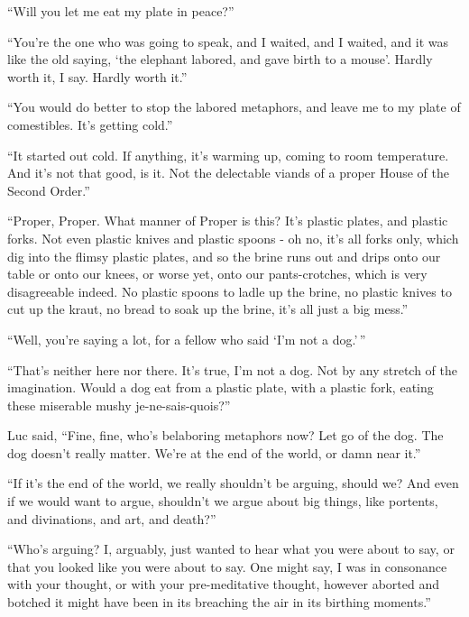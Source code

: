 ``Will you let me eat my plate in peace?''

``You're the one who was going to speak, and I waited, and I waited, and
it was like the old saying, `the elephant labored, and gave birth to a
mouse'. Hardly worth it, I say. Hardly worth it.''

``You would do better to stop the labored metaphors, and leave me to my
plate of comestibles. It's getting cold.''

``It started out cold. If anything, it's warming up, coming to room
temperature. And it's not that good, is it. Not the delectable viands of
a proper House of the Second Order.''

``Proper, Proper. What manner of Proper is this? It's plastic plates,
and plastic forks. Not even plastic knives and plastic spoons - oh no,
it's all forks only, which dig into the flimsy plastic plates, and so
the brine runs out and drips onto our table or onto our knees, or worse
yet, onto our pants-crotches, which is very disagreeable indeed. No
plastic spoons to ladle up the brine, no plastic knives to cut up the
kraut, no bread to soak up the brine, it's all just a big mess.''

``Well, you're saying a lot, for a fellow who said `I'm not a dog.'\,''

``That's neither here nor there. It's true, I'm not a dog. Not by any
stretch of the imagination. Would a dog eat from a plastic plate, with a
plastic fork, eating these miserable mushy je-ne-sais-quois?''

Luc said, ``Fine, fine, who's belaboring metaphors now? Let go of the
dog. The dog doesn't really matter. We're at the end of the world, or
damn near it.''

``If it's the end of the world, we really shouldn't be arguing, should
we? And even if we would want to argue, shouldn't we argue about big
things, like portents, and divinations, and art, and death?''

``Who's arguing? I, arguably, just wanted to hear what you were about to
say, or that you looked like you were about to say. One might say, I was
in consonance with your thought, or with your pre-meditative thought,
however aborted and botched it might have been in its breaching the air
in its birthing moments.''

